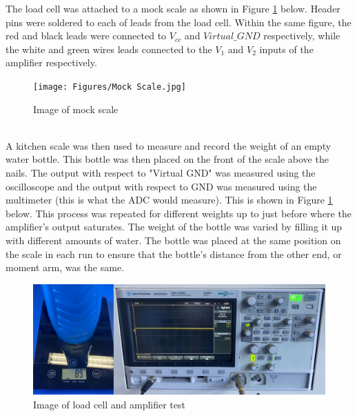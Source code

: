 \documentclass[class=report,11pt,crop=false]{standalone}
\begin{document}
	The load cell was attached to a mock scale as shown in Figure \ref{fig:S9} below. Header pins were soldered to each of leads from the load cell. Within the same figure, the red and black leads were connected to $V_{cc}$ and $Virtual\_GND$ respectively, while the white and green wires leads connected to the $V_1$ and $V_2$ inputs of the amplifier respectively. 
	\begin{figure}[h!]
		\centering
		\texttt{[image: Figures/Mock Scale.jpg]}
		\caption{Image of mock scale}
		\label{fig:S9}
	\end{figure} \\
	A kitchen scale was then used to measure and record the weight of an empty water bottle. This bottle was then placed on the front of the scale above the nails. The output with respect to "Virtual GND" was measured using the oscilloscope and the output with respect to GND was measured using the multimeter (this is what the ADC would measure). This is shown in Figure \ref{fig:S9} below. This process was repeated for different weights up to just before where the amplifier's output saturates. The weight of the bottle was varied by filling it up with different amounts of water. The bottle was placed at the same position on the scale in each run to ensure that the bottle's distance from the other end, or moment arm, was the same. 
	\begin{figure}[h!]
		\centering
		\includegraphics[width=0.8\linewidth]{Figures/ATP3.jpg}
		\caption{Image of load cell and amplifier test}
		\label{fig:S10}
	\end{figure}
	
\end{document}
